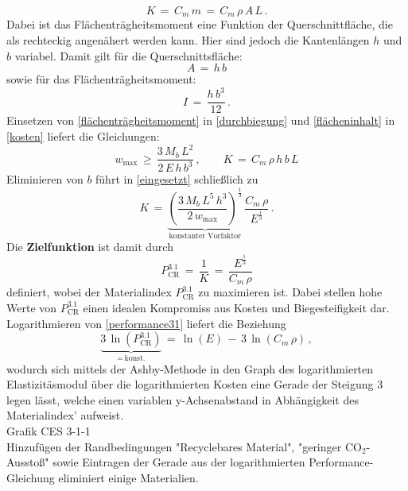 \begin{equation} \label{kosten}
	K\,=\,C_m\,m\,=\,C_m\,\rho\,A\,L\,.
\end{equation}
Dabei ist das Flächenträgheitsmoment eine Funktion der Querschnittfläche, die als rechteckig angenähert werden kann. Hier sind jedoch die Kantenlängen $h$ und $b$ variabel. Damit gilt für die Querschnittsfläche:
\begin{equation} \label{flächeninhalt}
A\,=\,h\,b
\end{equation}
sowie für das Flächenträgheitsmoment:
\begin{equation} \label{flächenträgheitsmoment}
I\,=\,\frac{h\,b^3}{12}\,.
\end{equation}
Einsetzen von \ref{flächenträgheitsmoment} in \ref{durchbiegung} und \ref{flächeninhalt} in \ref{kosten} liefert die Gleichungen:
\begin{equation} \label{eingesetzt}
	w_{\text{max}}\,\ge\,\frac{3\,M_b \,L^2}{2\,E\,h\,b^3}\,, \qquad
	K\,=\,C_m\,\rho\,h\,b\,L
\end{equation}
Eliminieren von $b$ führt in \ref{eingesetzt} schließlich zu
\begin{equation}\label{performance}
K\,=\,\underbrace{\left(\frac{3\,M_b\,L^5\,h^3}{2\,w_{\text{max}}}\right)^{\frac{1}{3}}}_{\text{konstanter Vorfaktor}}\,\frac{C_m\,\rho}{E^{\frac{1}{3}}}\,.
\end{equation}
Die \textbf{Zielfunktion} ist damit durch
\begin{equation} \label{performance31}
P_{\text{CR}}^{3.1}\,=\,\frac{1}{K}\,=\,\frac{E^\frac{1}{3}}{C_m\,\rho}
\end{equation}
definiert, wobei der Materialindex $P_{\text{CR}}^{3.1}$ zu maximieren ist. Dabei stellen hohe Werte von $P_{\text{CR}}^{3.1}$ einen idealen Kompromiss aus Kosten und Biegesteifigkeit dar.\\
Logarithmieren von \ref{performance31} liefert die Beziehung
\begin{equation}
\underbrace{3\,\ln(P_{\text{CR}}^{3.1})}_{=\,\text{konst.}}\,=\,\ln(E)\,-\,3\,\ln(C_m\,\rho)\,,
\end{equation}
wodurch sich mittels der Ashby-Methode in den Graph des logarithmierten Elastizitäsmodul über die logarithmierten Kosten eine Gerade der Steigung 3 legen lässt, welche einen variablen y-Achsenabstand in Abhängigkeit des Materialindex' aufweist.\\
Grafik CES 3-1-1\\
Hinzufügen der Randbedingungen "Recyclebares Material", "geringer CO$_2$-Ausstoß" sowie Eintragen der Gerade aus der logarithmierten Performance-Gleichung eliminiert einige Materialien.\\

